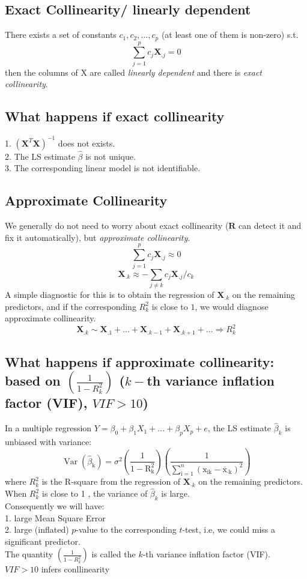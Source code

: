 \documentclass[11pt,a4paper]{article}
\begin{document}
\subsection{Exact Collinearity/ linearly dependent}
There exists a set of constants $c_1,c_2,...,c_p$ (at least one of them is non-zero) s.t.
$$\sum_{j=1}^pc_j \mathbf{X}_{.j}=0$$
then the columns of X are called \textit{linearly dependent} and there is \textit{exact collinearity}.

\subsection{What happens if exact collinearity}
1. $(\mathbf{X}^T \mathbf{X})^{-1}$ does not exists.\\
2. The LS estimate $\hat{\beta}$ is not unique.\\
3. The corresponding linear model is not identifiable.

\subsection{Approximate Collinearity}
We generally do not need to worry about exact collinearity ($\mathbf{R}$ can detect it and ﬁx it automatically), but \textit{approximate collinearity}.
$$\sum_{j=1}^pc_j \mathbf{X}_{.j}\approx 0$$
$$\mathbf{X}_{.k}\approx -\sum_{j\neq k}c_j \mathbf{X}_{.j}/c_k$$
A simple diagnostic for this is to obtain the regression of $\mathbf{X}_{.k}$ on the remaining predictors, and if the corresponding $R_k^2$ is close to $1$, we would diagnose approximate collinearity.
$$\mathbf{X}_{.k}\sim \mathbf{X}_{.1}+\ldots+\mathbf{X}_{.k-1}+\mathbf{X}_{.k+1}+\ldots \Rightarrow	R_k^2$$

\subsection{What happens if approximate collinearity: based on $\left(\frac{1}{1-R_{k}^{2}}\right)$ ($k-$th variance inﬂation factor (VIF), $VIF>10$)}
In a multiple regression $Y=\beta_{0}+\beta_{1} X_{1}+\ldots+\beta_{p} X_{p}+e$, the LS estimate $\hat{\beta}_{k}$ is unbiased with variance:
$$
\operatorname{Var}\left(\hat{\beta}_{\mathrm{k}}\right)=\sigma^{2}\left(\frac{1}{1-\mathrm{R}_{\mathrm{k}}^{2}}\right)\left(\frac{1}{\sum_{\mathrm{i}=1}^{n}\left(\mathrm{x}_{\mathrm{ik}}-\overline{\mathrm{x}}_{\cdot \mathrm{k}}\right)^{2}}\right)
$$
where $R_{k}^{2}$ is the R-square from the regression of $\mathbf{X}_{\cdot k}$ on the remaining predictors. When $R_{k}^{2}$ is close to 1 , the variance of $\hat{\beta}_{k}$ is large.\\
Consequently we will have:\\
1. large Mean Square Error\\
2. large (inflated) $p$-value to the corresponding $t$-test, i.e, we could miss a significant predictor.\\
The quantity $\left(\frac{1}{1-R_{k}^{2}}\right)$ is called the $k$-th variance inflation factor (VIF).\\
${VIF}>10$ infers conllinearity
\end{document}
